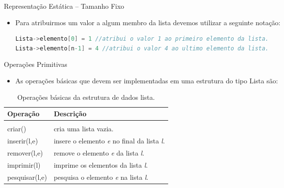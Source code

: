\begin{frame}[fragile,c]{Representação Estática -- Tamanho Fixo}
\begin{itemize}

 \item Para atribuirmos um valor a algum membro da lista devemos utilizar a seguinte notação:

\small	
\begin{lstlisting}[language=C]
Lista->elemento[0] = 1 //atribui o valor 1 ao primeiro elemento da lista.
Lista->elemento[n-1] = 4 //atribui o valor 4 ao ultimo elemento da lista.
\end{lstlisting}
\end{itemize}
\end{frame}  

\begin{frame}{Operações Primitivas}
  \begin{itemize}
	  \item As operações básicas que devem ser implementadas em uma estrutura do tipo Lista são:		
  \end{itemize}
  \begin{table}[!htpb]
	\centering
    \begin{tabular}{l|l}
	 \hline \hline 
	 \textbf{Operação} & \textbf{Descrição} \\
	\hline \hline \\
	criar() & cria uma lista vazia.\\
	 \hline inserir(l,e) & insere o elemento \textit{e} no final da lista \textit{l}.\\
	 \hline remover(l,e) & remove o elemento \textit{e} da lista \textit{l}.\\
	\hline imprimir(l) & imprime os elementos da lista \textit{l}.\\
	\hline pesquisar(l,e) & pesquisa o elemento \textit{e} na lista \textit{l}.\\
	\hline 	\hline 
	\end{tabular}
	\caption{Operações básicas da estrutura de dados lista.}
\end{table}
\end{frame}
 

